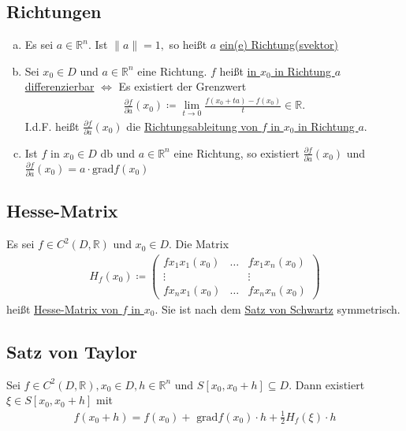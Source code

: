 \subsection{Richtungen}
\begin{enumerate}[a)]
    \item Es sei $a \in \mathbb{R}^n$. Ist $\lVert a \rVert = 1,$ so heißt $a$ \underline{ein(e) Richtung(svektor)}
    \item Sei $x_0 \in D$ und $a \in \mathbb{R}^n$ eine Richtung. $f$ heißt \underline{in $x_0$ in Richtung $a$ differenzierbar} $\Leftrightarrow$ Es existiert der Grenzwert
    \begin{align*}
        \frac{\partial f}{\partial a}(x_0) \coloneqq \lim \limits_{t \to 0} \frac{f(x_0 + ta) -f(x_0)}{t} \in \mathbb{R}.
    \end{align*}
    I.d.F. heißt $\frac{\partial f}{\partial a}(x_0)$ die \underline{Richtungsableitung von $f$ in $x_0$ in Richtung $a$}.
    \item Ist $f$ in $x_0 \in D$ db und $a \in \mathbb{R}^n$ eine Richtung, so existiert $\frac{\partial f}{\partial a}(x_0)$ und 
    $\frac{\partial f}{\partial a}(x_0) = a \cdot \text{grad}f(x_0)$
\end{enumerate}

\subsection{Hesse-Matrix}
Es sei $f \in C^2(D,\mathbb{R})$ und $x_0 \in D$. Die Matrix 
\begin{align*}
    H_f(x_0) \coloneqq \begin{pmatrix} f{x_1x_1}(x_0) & \ldots & f{x_1x_n}(x_0) \\ \vdots & & \vdots \\ f{x_nx_1}(x_0) & \ldots & f{x_nx_n}(x_0)\end{pmatrix}
\end{align*}
heißt \underline{Hesse-Matrix von $f$ in $x_0$}. Sie ist nach dem \hyperref[sec: Schwartz]{Satz von Schwartz} symmetrisch.

\subsection{Satz von Taylor}
Sei $f \in C^2(D,\mathbb{R}), x_0 \in D, h \in \mathbb{R}^n$ und $S[x_0,x_0+h] \subseteq D$. Dann existiert $\xi \in S[x_0,x_0+h]$ mit
\begin{align*}
    f(x_0+h) = f(x_0) + \text{ grad}f(x_0) \cdot h + \frac{1}{2} H_f(\xi) \cdot h
\end{align*}


